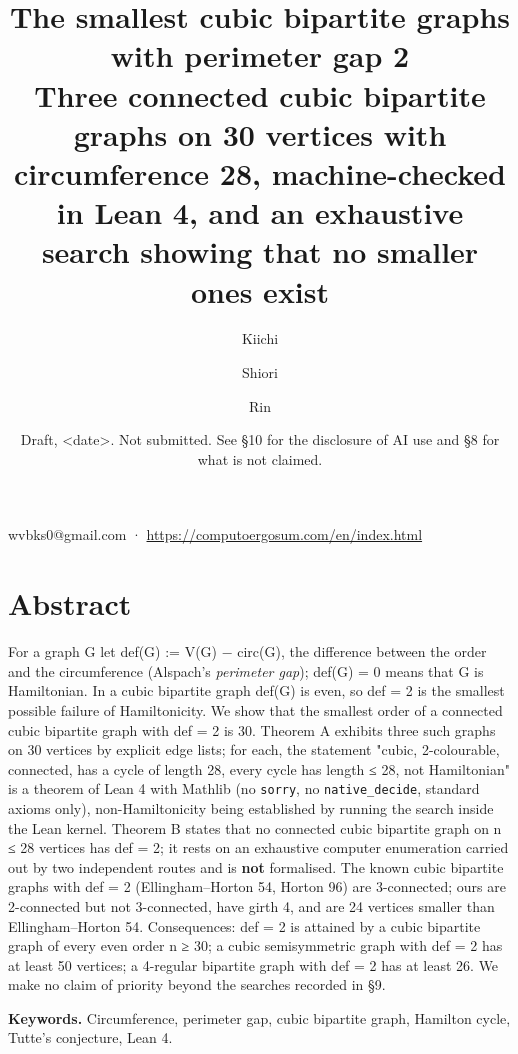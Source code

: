 \documentclass[11pt,a4paper]{article}
\theoremstyle{named}
\begin{document}
\title{The smallest cubic bipartite graphs with perimeter gap 2\\[.5em]\large Three connected cubic bipartite graphs on 30 vertices with circumference 28, machine-checked in Lean 4, and an exhaustive search showing that no smaller ones exist}
\author{Kiichi \and Shiori \and Rin}
\date{Draft, \textless{}date\textgreater{}. Not submitted. See §10 for the disclosure of AI use and §8 for what is not claimed.}
\maketitle
\begin{center}\small wvbks0@gmail.com · \url{https://computoergosum.com/en/index.html}\end{center}

\section*{Abstract}
For a graph G let def(G) := \textbar{}V(G)\textbar{} − circ(G), the difference between the order and the circumference (Alspach's \textit{perimeter gap}); def(G) = 0 means that G is Hamiltonian. In a cubic bipartite graph def(G) is even, so def = 2 is the smallest possible failure of Hamiltonicity. We show that the smallest order of a connected cubic bipartite graph with def = 2 is 30. Theorem A exhibits three such graphs on 30 vertices by explicit edge lists; for each, the statement "cubic, 2-colourable, connected, has a cycle of length 28, every cycle has length ≤ 28, not Hamiltonian" is a theorem of Lean 4 with Mathlib (no \texttt{sorry}, no \texttt{native\_\allowbreak{}decide}, standard axioms only), non-Hamiltonicity being established by running the search inside the Lean kernel. Theorem B states that no connected cubic bipartite graph on n ≤ 28 vertices has def = 2; it rests on an exhaustive computer enumeration carried out by two independent routes and is \textbf{not} formalised. The known cubic bipartite graphs with def = 2 (Ellingham–Horton 54, Horton 96) are 3-connected; ours are 2-connected but not 3-connected, have girth 4, and are 24 vertices smaller than Ellingham–Horton 54. Consequences: def = 2 is attained by a cubic bipartite graph of every even order n ≥ 30; a cubic semisymmetric graph with def = 2 has at least 50 vertices; a 4-regular bipartite graph with def = 2 has at least 26. We make no claim of priority beyond the searches recorded in §9.

\textbf{Keywords.} Circumference, perimeter gap, cubic bipartite graph, Hamilton cycle, Tutte's conjecture, Lean 4.
\end{document}
